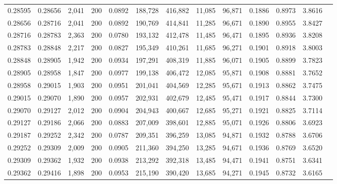 \begin{tabular}{rrrrrrrrrrrrr}
0.28595 & 0.28656 & 2,041 & 200 &                                     0.0892 & 188,728 & 416,882 &  11,085 &  96,871 & 0.1886 & 0.8973 & 3.8616 \\
0.28656 & 0.28716 & 2,041 & 200 &                                     0.0892 & 190,769 & 414,841 &  11,285 &  96,671 & 0.1890 & 0.8955 & 3.8427 \\
0.28716 & 0.28783 & 2,363 & 200 &                                     0.0780 & 193,132 & 412,478 &  11,485 &  96,471 & 0.1895 & 0.8936 & 3.8208 \\
0.28783 & 0.28848 & 2,217 & 200 &                                     0.0827 & 195,349 & 410,261 &  11,685 &  96,271 & 0.1901 & 0.8918 & 3.8003 \\
0.28848 & 0.28905 & 1,942 & 200 &                                     0.0934 & 197,291 & 408,319 &  11,885 &  96,071 & 0.1905 & 0.8899 & 3.7823 \\
0.28905 & 0.28958 & 1,847 & 200 &                                     0.0977 & 199,138 & 406,472 &  12,085 &  95,871 & 0.1908 & 0.8881 & 3.7652 \\
0.28958 & 0.29015 & 1,903 & 200 &                                     0.0951 & 201,041 & 404,569 &  12,285 &  95,671 & 0.1913 & 0.8862 & 3.7475 \\
0.29015 & 0.29070 & 1,890 & 200 &                                     0.0957 & 202,931 & 402,679 &  12,485 &  95,471 & 0.1917 & 0.8844 & 3.7300 \\
0.29070 & 0.29127 & 2,012 & 200 &                                     0.0904 & 204,943 & 400,667 &  12,685 &  95,271 & 0.1921 & 0.8825 & 3.7114 \\
0.29127 & 0.29186 & 2,066 & 200 &                                     0.0883 & 207,009 & 398,601 &  12,885 &  95,071 & 0.1926 & 0.8806 & 3.6923 \\
0.29187 & 0.29252 & 2,342 & 200 &                                     0.0787 & 209,351 & 396,259 &  13,085 &  94,871 & 0.1932 & 0.8788 & 3.6706 \\
0.29252 & 0.29309 & 2,009 & 200 &                                     0.0905 & 211,360 & 394,250 &  13,285 &  94,671 & 0.1936 & 0.8769 & 3.6520 \\
0.29309 & 0.29362 & 1,932 & 200 &                                     0.0938 & 213,292 & 392,318 &  13,485 &  94,471 & 0.1941 & 0.8751 & 3.6341 \\
0.29362 & 0.29416 & 1,898 & 200 &                                     0.0953 & 215,190 & 390,420 &  13,685 &  94,271 & 0.1945 & 0.8732 & 3.6165 \\

\end{tabular}
